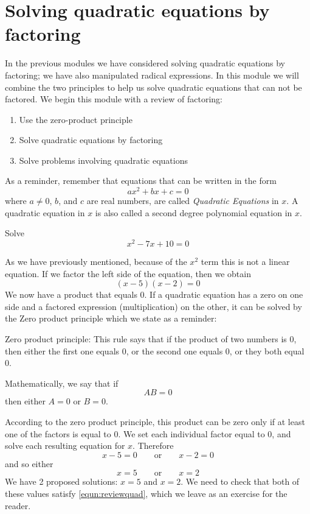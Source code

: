 \section{Solving quadratic equations by factoring}
%
In the previous modules we have considered solving \gls{quadratic} equations by factoring;
we have also manipulated radical expressions. In this module we will combine the two
principles to help us \gls{solve} quadratic equations that can not be factored. We begin
this module with a review of factoring: 
\begin{enumerate}
	\item Use the zero-product principle
	\item Solve quadratic equations by factoring
	\item Solve problems involving quadratic equations
\end{enumerate} 
As a reminder, remember that equations that can be written in the form
\[
	ax^2 + bx+c =0
\]
where $a\ne 0$, $b$, and $c$ are real numbers, are called {\em Quadratic Equations} in $x$. A 
quadratic \gls{equation} in $x$ is also called a second \gls{degree} \gls{polynomial} equation in $x$.

\begin{myexample}
Solve
\begin{equation}\label{equn:reviewquad}
	x^2-7x+10 = 0
\end{equation}
\end{myexample}
\begin{myProof}
	As we have previously mentioned, because of the $x^2$ term this is not a \gls{linear} equation. If we factor the left side
	of the equation, then we obtain
	\[
		(x-5)(x-2) = 0
	\]
	We now have a product that equals 0. If a quadratic equation has a zero on one side and a factored \gls{expression} (multiplication) on 
	the other, it can be solved by the Zero product principle which we state as a reminder:
		
	\begin{myDefinition}
		{Zero product principle}: 
		This rule says that if the product of two numbers is 0, then either the first one equals 0, or the second one
		equals 0, or they both equal 0. 
				
		Mathematically, we say that if
		\[
			AB=0
		\]
		then either $A=0$ or $B=0$.
	\end{myDefinition}
		
	According to the zero product principle, this product can be zero only if at least one of the factors is equal
	to 0. We set each individual factor equal to 0, and solve each resulting equation for $x$. 
	Therefore
	\[
		x-5 = 0 \qquad {\mathrm{or}}\qquad  x-2=0
	\]
	and so either
	\[
		x=5 \qquad {\mathrm{or}} \qquad x=2
	\]
	We have 2 proposed solutions: $x=5$ and $x=2$. We need to check that both of these values satisfy \cref{equn:reviewquad},
	which we leave as an exercise for the reader.
\end{myProof} 

